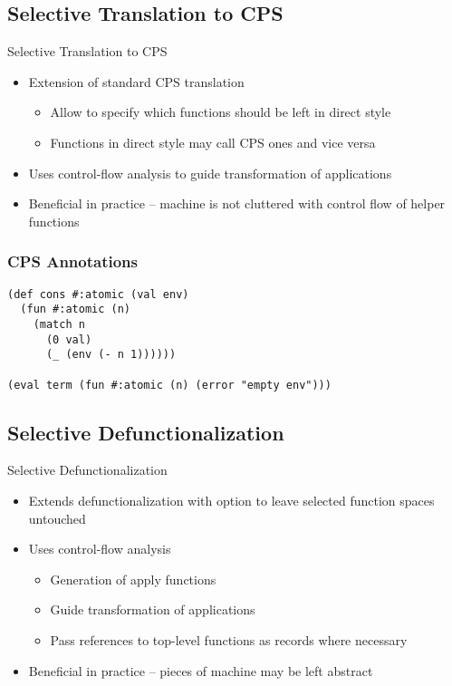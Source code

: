 \documentclass{beamer}
\begin{document}
\subsection{Selective Translation to CPS}

\begin{frame}{Selective Translation to CPS}
  \begin{itemize}
    \item Extension of standard CPS translation
    \begin{itemize}
      \item Allow to specify which functions should be left in direct style
      \item Functions in direct style may call CPS ones and vice versa
    \end{itemize}
    \item Uses control-flow analysis to guide transformation of applications
    \item Beneficial in practice -- machine is not cluttered with control flow of helper functions
  \end{itemize}
\end{frame}

\begin{frame}[fragile]
  \frametitle{CPS Annotations}
  \begin{lstlisting}
(def cons #:atomic (val env)
  (fun #:atomic (n)
    (match n
      (0 val)
      (_ (env (- n 1))))))

(eval term (fun #:atomic (n) (error "empty env")))
  \end{lstlisting}
\end{frame}


\subsection{Selective Defunctionalization}

\begin{frame}{Selective Defunctionalization}
  \begin{itemize}
    \item Extends defunctionalization with option to leave selected function spaces untouched
    \item Uses control-flow analysis
    \begin{itemize}
      \item Generation of apply functions
      \item Guide transformation of applications
      \item Pass references to top-level functions as records where necessary
    \end{itemize}
    \item Beneficial in practice -- pieces of machine may be left abstract
  \end{itemize}
\end{frame}
\end{document}
